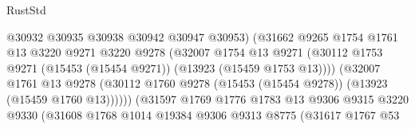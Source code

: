 \begin{lexlean}{RustStd}
\begin{coremodule}
                                          @30932
                                          @30935
                                          @30938
                                          @30942
                                          @30947
                                          @30953)
                                        (@31662
                                          @9265
                                          @1754
                                          @1761
                                          @13
                                          @3220
                                          @9271
                                          @3220
                                          @9278
                                          (@32007
                                            @1754
                                            @13
                                            @9271
                                            (@30112
                                              @1753
                                              @9271
                                              (@15453 (@15454 @9271))
                                              (@13923 (@15459 @1753 @13))))
                                          (@32007
                                            @1761
                                            @13
                                            @9278
                                            (@30112
                                              @1760
                                              @9278
                                              (@15453 (@15454 @9278))
                                              (@13923 (@15459 @1760 @13))))))
                                      (@31597
                                        @1769
                                        @1776
                                        @1783
                                        @13
                                        @9306
                                        @9315
                                        @3220
                                        @9330
                                        (@31608
                                          @1768
                                          @1014
                                          @19384
                                          @9306
                                          @9313
                                          @8775
                                          (@31617
                                            @1767
                                            @53

\end{coremodule}
\end{lexlean}
